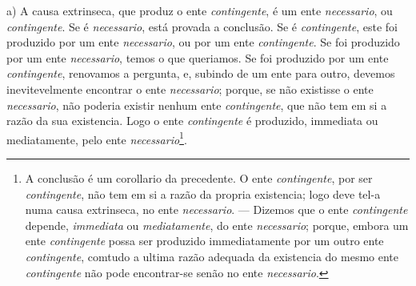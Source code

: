 a) A causa extrinseca, que produz o ente \emph{contingente}, é um ente \emph{necessario}, ou \emph{contingente}. Se é \emph{necessario}, está provada a conclusão. Se é \emph{contingente}, este foi produzido por um ente \emph{necessario}, ou por um ente \emph{contingente}. Se foi produzido por um ente \emph{necessario}, temos o que queriamos. Se foi produzido por um ente \emph{contingente}, renovamos a pergunta, e, subindo de um ente para outro, devemos inevitevelmente encontrar o ente \emph{necessario}; porque, se não existisse o ente \emph{necessario}, não poderia existir nenhum ente \emph{contingente}, que não tem em si a razão da sua existencia. Logo o ente \emph{contingente} é produzido, immediata ou mediatamente, pelo ente \emph{necessario}\footnote{A conclusão é um corollario da precedente. O ente \emph{contingente}, por ser \emph{contingente}, não tem em si a razão da propria existencia; logo deve tel-a numa causa extrinseca, no ente \emph{necessario}. --- Dizemos que o ente \emph{contingente} depende, \emph{immediata} ou \emph{mediatamente}, do ente \emph{necessario}; porque, embora um ente \emph{contingente} possa ser produzido immediatamente por um outro ente \emph{contingente}, comtudo a ultima razão adequada da existencia do mesmo ente \emph{contingente} não pode encontrar-se senão no ente \emph{necessario}.}.

